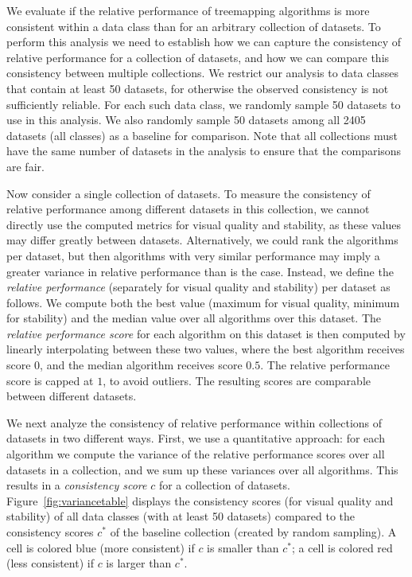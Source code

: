 We evaluate if the relative performance of treemapping algorithms is more consistent within a data class than for an arbitrary collection of datasets. To perform this analysis we need to establish how we can capture the consistency of relative performance for a collection of datasets, and how we can compare this consistency between multiple collections. 
%
We restrict our analysis to data classes that contain at least 50 datasets, for otherwise the observed consistency is not sufficiently reliable. For each such data class, we randomly sample 50 datasets to use in this analysis. We also randomly sample 50 datasets among all 2405 datasets (all classes) as a baseline for comparison. Note that all collections must have the same number of datasets in the analysis to ensure that the comparisons are fair.

Now consider a single collection of datasets. To measure the consistency of relative performance among different datasets in this collection, we cannot directly use the computed metrics for visual quality and stability, as these values may differ greatly between datasets. Alternatively, we could rank the algorithms per dataset, but then algorithms with very similar performance may imply a greater variance in relative performance than is the case. Instead, we define the \emph{relative performance} (separately for visual quality and stability) per dataset as follows. We compute both the best value (maximum for visual quality, minimum for stability) and the median value over all algorithms over this dataset. The \emph{relative performance score} for each algorithm on this dataset is then computed by linearly interpolating between these two values, where the best algorithm receives score $0$, and the median algorithm receives score $0.5$. The relative performance score is capped at $1$, to avoid outliers. The resulting scores are comparable between different datasets.



We next analyze the consistency of relative performance within collections of datasets in two different ways. First, we use a quantitative approach: for each algorithm we compute the variance of the relative performance scores over all datasets in a collection, and we sum up these variances over all algorithms. This results in a \emph{consistency score} $c$ for a collection of datasets. Figure~\ref{fig:variancetable} displays the consistency scores (for visual quality and stability) of all data classes (with at least 50 datasets) compared to the consistency scores $c^*$ of the baseline collection (created by random sampling). A cell is colored blue (more consistent) if $c$ is smaller than $c^*$; a cell is colored red (less consistent) if $c$ is larger than $c^*$.

